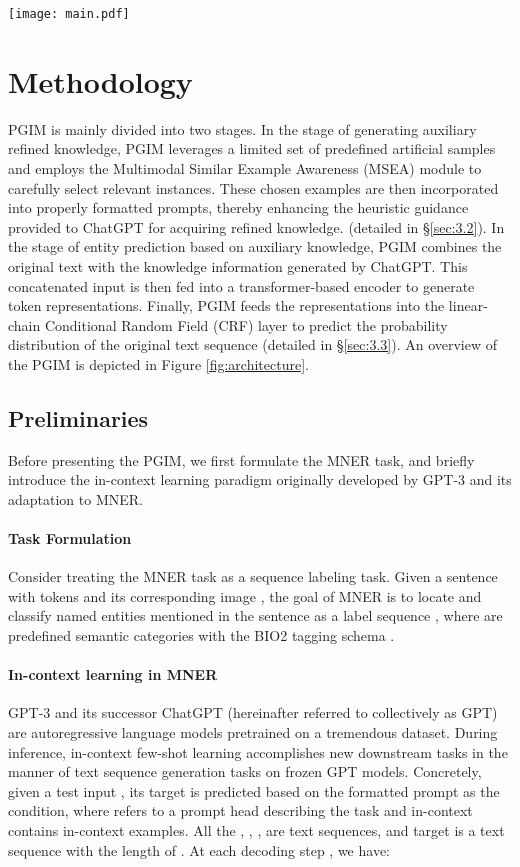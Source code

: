 \documentclass[11pt]{article}
\begin{document}
\begin{figure*}[t!]
	\centering
	\texttt{[image: main.pdf]}
	\caption{The architecture of PGIM.}
	\label{fig:architecture}
\end{figure*}
\section{Methodology}
PGIM is mainly divided into two stages. 
In the stage of generating auxiliary refined knowledge, PGIM leverages a limited set of predefined artificial samples and employs the Multimodal Similar Example Awareness (MSEA) module to carefully select relevant instances. These chosen examples are then incorporated into properly formatted prompts, thereby enhancing the heuristic guidance provided to ChatGPT for acquiring refined knowledge. (detailed in §\ref{sec:3.2}). 
In the stage of entity prediction based on auxiliary knowledge, PGIM combines the original text with the knowledge information generated by ChatGPT. This concatenated input is then fed into a transformer-based encoder to generate token representations.
Finally, PGIM feeds the representations into the linear-chain Conditional Random Field (CRF) \citep{lafferty2001conditional} layer to predict the probability distribution of the original text sequence (detailed in §\ref{sec:3.3}). An overview of the PGIM is depicted in Figure \ref{fig:architecture}.

\subsection{Preliminaries}
Before presenting the PGIM, we first formulate the MNER task, and briefly introduce the in-context learning paradigm originally developed by GPT-3 \citep{brown2020language} and its adaptation to MNER.

\paragraph{Task Formulation} 
Consider treating the MNER task as a sequence labeling task. Given a sentence  with  tokens and its corresponding image , the goal of MNER is to locate and classify named entities mentioned in the sentence as a label sequence , where  are predefined semantic categories with the BIO2 tagging schema \citep{sang1999representing}.

\paragraph{In-context learning in MNER}
GPT-3 and its successor ChatGPT (hereinafter referred to collectively as GPT) are autoregressive language models pretrained on a tremendous dataset. During inference, in-context few-shot learning accomplishes new downstream tasks in the manner of text sequence generation tasks on frozen GPT models. Concretely, given a test input , its target  is predicted based on the formatted prompt  as the condition, where  refers to a prompt head describing the task and in-context  contains  in-context examples. 
All the , , ,  are text sequences, and target  is a text sequence with the length of . At each decoding step , we have:
\end{document}
